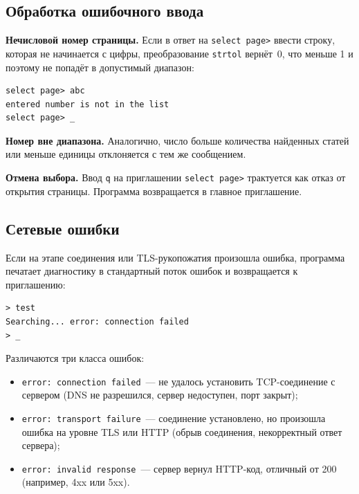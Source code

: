 \documentclass[12pt]{extarticle}
\renewcommand{\baselinestretch}{1.5}
\begin{document}
\subsection{Обработка ошибочного ввода}

\textbf{Нечисловой номер страницы.} Если в ответ на
\texttt{select page>} ввести строку, которая не начинается с
цифры, преобразование \texttt{strtol} вернёт~0, что меньше 1 и
поэтому не попадёт в допустимый диапазон:

\renewcommand{\baselinestretch}{1}
\begin{lstlisting}
select page> abc
entered number is not in the list
select page> _
\end{lstlisting}
\renewcommand{\baselinestretch}{1.5}

\textbf{Номер вне диапазона.} Аналогично, число больше количества
найденных статей или меньше единицы отклоняется с тем же
сообщением.

\textbf{Отмена выбора.} Ввод \texttt{q} на приглашении
\texttt{select page>} трактуется как отказ от открытия страницы.
Программа возвращается в главное приглашение.

\subsection{Сетевые ошибки}

Если на этапе соединения или TLS-рукопожатия произошла ошибка,
программа печатает диагностику в стандартный поток ошибок и
возвращается к приглашению:

\renewcommand{\baselinestretch}{1}
\begin{lstlisting}
> test
Searching... error: connection failed
> _
\end{lstlisting}
\renewcommand{\baselinestretch}{1.5}

Различаются три класса ошибок:

\begin{itemize}
    \item \texttt{error: connection failed}~--- не удалось
          установить TCP-соединение с сервером (DNS не разрешился,
          сервер недоступен, порт закрыт);
    \item \texttt{error: transport failure}~--- соединение
          установлено, но произошла ошибка на уровне TLS или
          HTTP (обрыв соединения, некорректный ответ сервера);
    \item \texttt{error: invalid response}~--- сервер вернул
          HTTP-код, отличный от 200 (например, 4xx или 5xx).
\end{itemize}
\end{document}
